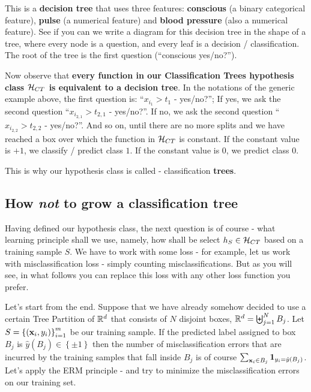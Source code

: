 This is a {\bf decision tree} that uses three features: {\bf conscious} (a
 binary categorical feature), {\bf pulse} (a numerical feature) and {\bf blood
 pressure} (also a numerical feature). See if you can we write a diagram for
 this decision tree in the shape of a tree, where every node is a question, and
 every leaf is a decision / classification. The root of the tree is the first
 question (``conscious yes/no?'').

 Now observe that {\bf every function in our Classification Trees 
   hypothesis class  $\mathcal{H}_{CT}$ is
 equivalent to a decision tree}. In the notations  of the generic example above, 
 the first question is: ``$x_{i_1} > t_1$ - yes/no?''; If yes, we ask the second
 question ``$x_{i_{2,1}} > t_{2,1}$ - yes/no?''. If no, we ask the second question
 ``$x_{i_{2,2}} > t_{2,2}$ - yes/no?''. And so on, until there are no more splits and we
 have reached a box over which 
 the function in $\mathcal{H}_{CT}$ is constant. If the constant value is $+1$, we
 classify / predict class $1$. If the constant value is $0$, we predict class
 $0$. 

 This is why our hypothesis class is called - classification {\bf trees}.

 \subsection{How {\em not} to grow a classification tree}

 Having defined our hypothesis class, the next question is of course - what
 learning principle shall we use, namely, how shall be select $h_S\in\mathcal{H}_{CT}$
 based on a training sample $S$. We have to work with some loss - for example,
 let us work with misclassification loss - simply counting misclassifications.
 But as you will see, in what follows you can replace this  loss with any other
 loss function you prefer. 

 Let's start from the end. Suppose that we have already somehow 
 decided to use a certain Tree Partition of $\mathbb{R}^d$ that consists of $N$ disjoint boxes,
 $\mathbb{R}^d=\biguplus_{j=1}^N B_j$. Let $S=\left\{ (\mathbf{x}_i,y_i)
 \right\}_{i=1}^m$ be our training sample.
 If the predicted
 label assigned to box $B_j$ is $\hat{y}(B_j)\in\left\{ \pm 1 \right\}$ then 
 the number of misclassification errors that are incurred by the training
 samples that fall inside $B_j$ is of course $\sum_{ \mathbf{x}_i\in B_j
 }\mathbf{1}_{y_i=\hat{y}(B_j)}$. Let's apply the ERM principle - and try to
 minimize the misclassification errors on our training set. 
 
